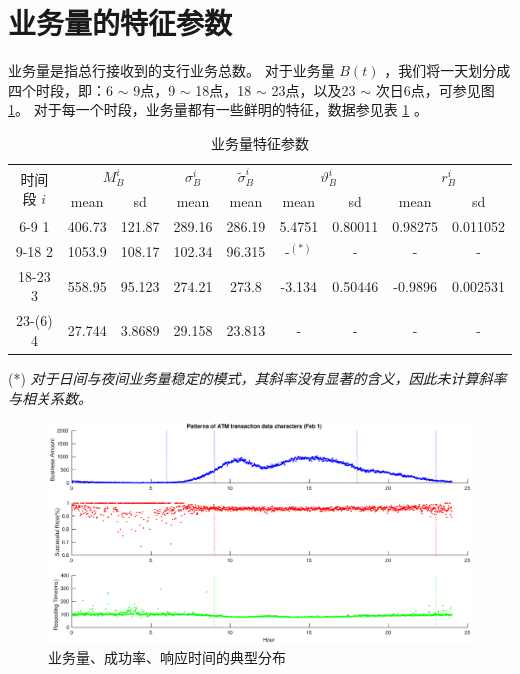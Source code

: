 \documentclass[a4paper]{article}
\begin{document}
\section{业务量的特征参数}
\indent 业务量是指总行接收到的支行业务总数。
对于业务量 $B(t)$ ，我们将一天划分成四个时段，即：6 $\sim$ 9点，9 $\sim$ 18点，18 $\sim$ 23点，以及23 $\sim$ 次日6点，可参见图 \ref{fig:char_feb-1}。
对于每一个时段，业务量都有一些鲜明的特征，数据参见表 \ref{tab:char_B} 。
\begin{table}[H]
	\centering
	\caption{业务量特征参数}
	\label{tab:char_B}
	\begin{tabular}{c|cc|c|c|cc|cc}
		\hline
		\multirow{2}{*}{时间段 $i$} & \multicolumn{2}{c}{$M_B^i$} & $\sigma_B^i$ & $\tilde{\sigma}_B^i$ & \multicolumn{2}{c}{$\vartheta_B^i$} & \multicolumn{2}{c}{$r_B^i$} \\
		& mean         & sd           & mean        & mean                 & mean             & sd               & mean         & sd           \\
		\hline
		6-9 1                    & 406.73       & 121.87       & 289.16      & 286.19               & 5.4751           & 0.80011          & 0.98275      & 0.011052     \\
        9-18 2                   & 1053.9       & 108.17       & 102.34      & 96.315               & -$^{(*)}$     & -                & -            & -            \\
		18-23 3                  & 558.95       & 95.123       & 274.21      & 273.8                & -3.134           & 0.50446          & -0.9896      & 0.002531     \\
		23-(6) 4                 & 27.744       & 3.8689       & 29.158      & 23.813               & -                & -                & -            & -           \\
		\hline
	\end{tabular}
\end{table}
(*) \emph{对于日间与夜间业务量稳定的模式，其斜率没有显著的含义，因此未计算斜率与相关系数。}
\begin{figure}[htbp]
	\centering
	\includegraphics[scale=0.4]{pic/feb-1-bsr-pattern.eps}
	\caption{业务量、成功率、响应时间的典型分布}
    \label{fig:char_feb-1}
\end{figure}
\end{document}
